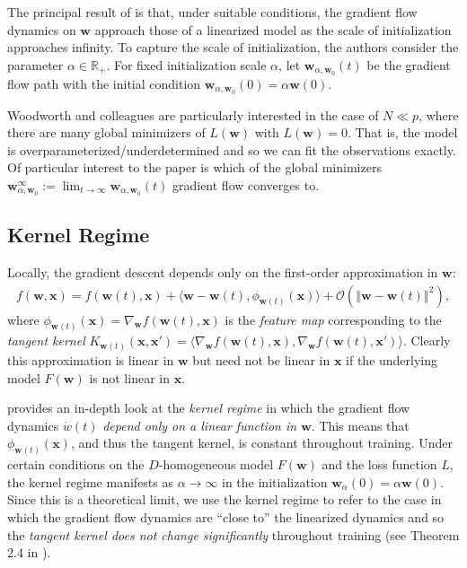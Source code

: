 \documentclass{article}
\begin{document}
The principal result of \cite{chizat2018lazy} is that, under suitable conditions, the gradient flow dynamics on $\boldsymbol{w}$ approach those of a linearized model as the scale of initialization approaches infinity. To capture the scale of initialization, the authors consider the parameter $\alpha \in \mathbb{R}_+$. For fixed initialization scale $\alpha$, let $\boldsymbol{w}_{\alpha, \boldsymbol{w}_0}(t)$ be the gradient flow path with the initial condition $\boldsymbol{w}_{\alpha, \boldsymbol{w}_0}(0) = \alpha \boldsymbol{w}(0)$.

Woodworth and colleagues are particularly interested in the case of  $N \ll p$, where there are many global minimizers of $L(\boldsymbol{w})$ with $L(\boldsymbol{w}) = 0$. That is, the model is overparameterized/underdetermined and so we can fit the observations exactly. Of particular interest to the paper is which of the global minimizers $\boldsymbol{w}_{\alpha, \boldsymbol{w}_0}^{\infty} := \lim_{t \rightarrow \infty} \boldsymbol{w}_{\alpha, \boldsymbol{w}_0}(t)$ gradient flow converges to. 

\subsection{Kernel Regime}
Locally, the gradient descent depends only on the first-order approximation in $\boldsymbol{w}$:
\begin{align*}
    f(\boldsymbol{w}, \boldsymbol{x}) = f(\boldsymbol{w}(t), \boldsymbol{x}) + \langle \boldsymbol{w} - \boldsymbol{w}(t), \phi_{\boldsymbol{w}(t)}(\boldsymbol{x}) \rangle + \mathcal{O}( \left\Vert \boldsymbol{w} - \boldsymbol{w}(t) \right\Vert^2),
\end{align*}
where $\phi_{\boldsymbol{w}(t)}(\boldsymbol{x}) = \nabla_{\boldsymbol{w}} f(\boldsymbol{w}(t), \boldsymbol{x})$ is the \textit{feature map} corresponding to the \textit{tangent kernel} $K_{\boldsymbol{w}(t)}(\boldsymbol{x}, \boldsymbol{x}') = \langle \nabla_{\boldsymbol{w}} f(\boldsymbol{w}(t), \boldsymbol{x}), \nabla_{\boldsymbol{w}} f(\boldsymbol{w}(t), \boldsymbol{x}')\rangle$. Clearly this approximation is linear in $\boldsymbol{w}$ but need not be linear in $\boldsymbol{x}$ if the underlying model $F(\boldsymbol{w})$ is not linear in $\boldsymbol{x}$.

\cite{chizat2018lazy} provides an in-depth look at the \textit{kernel regime} in which the gradient flow dynamics $\dot{w}(t)$ \textit{depend only on a linear function in $\boldsymbol{w}$}. This means that $\phi_{\boldsymbol{w}(t)}(\boldsymbol{x})$, and thus the tangent kernel, is constant throughout training. Under certain conditions on the $D$-homogeneous model $F(\boldsymbol{w})$ and the loss function $L$, the kernel regime manifests as $\alpha \rightarrow \infty$ in the initialization $\boldsymbol{w}_{\alpha}(0) = \alpha \boldsymbol{w}(0)$. Since this is a theoretical limit, we use the kernel regime to refer to the case in which the gradient flow dynamics are \enquote{close to} the linearized dynamics and so the \textit{tangent kernel does not change significantly} throughout training (see Theorem 2.4 in \cite{chizat2018lazy}).
\end{document}
